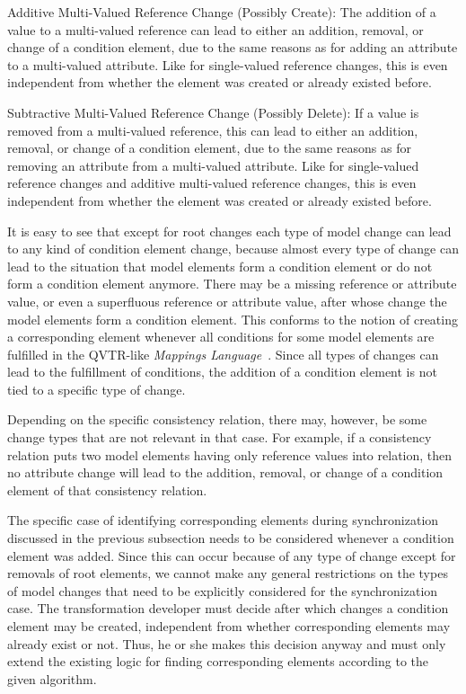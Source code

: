 \begin{properdescription}
    \item[Additive Multi-Valued Reference Change (Possibly Create):] The addition of a value to a multi-valued reference can lead to either an addition, removal, or change of a condition element, due to the same reasons as for adding an attribute to a multi-valued attribute. Like for single-valued reference changes, this is even independent from whether the element was created or already existed before.
    \item[Subtractive Multi-Valued Reference Change (Possibly Delete):] If a value is removed from a multi-valued reference, this can lead to either an addition, removal, or change of a condition element, due to the same reasons as for removing an attribute from a multi-valued attribute. Like for single-valued reference changes and additive multi-valued reference changes, this is even independent from whether the element was created or already existed before.
\end{properdescription}

It is easy to see that except for root changes each type of model change can lead to any kind of condition element change, because almost every type of change can lead to the situation that model elements form a condition element or do not form a condition element anymore.
There may be a missing reference or attribute value, or even a superfluous reference or attribute value, after whose change the model elements form a condition element.
This conforms to the notion of creating a corresponding element whenever all conditions for some model elements are fulfilled in the \gls{QVTR}-like \emph{Mappings Language}~\cite[p.~283]{kramer2017a}.
Since all types of changes can lead to the fulfillment of conditions, the addition of a condition element is not tied to a specific type of change.

Depending on the specific consistency relation, there may, however, be some change types that are not relevant in that case.
For example, if a consistency relation puts two model elements having only reference values into relation, then no attribute change will lead to the addition, removal, or change of a condition element of that consistency relation.

The specific case of identifying corresponding elements during synchronization discussed in the previous subsection needs to be considered whenever a condition element was added.
Since this can occur because of any type of change except for removals of root elements, we cannot make any general restrictions on the types of model changes that need to be explicitly considered for the synchronization case.
The transformation developer must decide after which changes a condition element may be created, independent from whether corresponding elements may already exist or not.
Thus, he or she makes this decision anyway and must only extend the existing logic for finding corresponding elements according to the given algorithm.
